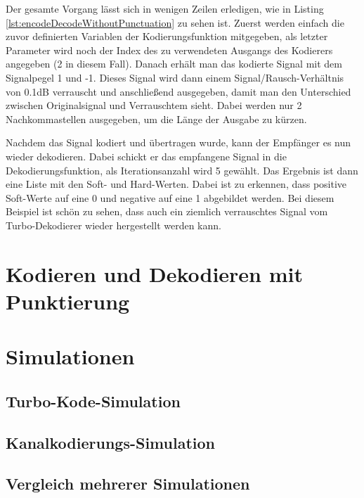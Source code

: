 Der gesamte Vorgang lässt sich in wenigen Zeilen erledigen, wie in Listing \ref{lst:encodeDecodeWithoutPunctuation} zu sehen ist. Zuerst werden einfach die zuvor definierten Variablen der Kodierungsfunktion mitgegeben, als letzter Parameter wird noch der Index des zu verwendeten Ausgangs des Kodierers angegeben (2 in diesem Fall). Danach erhält man das kodierte Signal mit dem Signalpegel 1 und -1. Dieses Signal wird dann einem Signal/Rausch-Verhältnis von 0.1dB  verrauscht und anschließend ausgegeben, damit man den Unterschied zwischen Originalsignal und Verrauschtem sieht. Dabei werden nur 2 Nachkommastellen ausgegeben, um die Länge der Ausgabe zu kürzen. 

Nachdem das Signal kodiert und übertragen wurde, kann der Empfänger es nun wieder dekodieren. Dabei schickt er das empfangene Signal in die Dekodierungsfunktion, als Iterationsanzahl wird 5 gewählt. Das Ergebnis ist dann eine Liste mit den Soft- und Hard-Werten. Dabei ist zu erkennen, dass positive Soft-Werte auf eine 0 und negative auf eine 1 abgebildet werden. Bei diesem Beispiel ist schön zu sehen, dass auch ein ziemlich verrauschtes Signal vom Turbo-Dekodierer wieder hergestellt werden kann.
\section{Kodieren und Dekodieren mit Punktierung}
\label{sec:example_withPunctuation}

\section{Simulationen}
\label{sec:example_simulations}

\subsection{Turbo-Kode-Simulation}

\subsection{Kanalkodierungs-Simulation}

\subsection{Vergleich mehrerer Simulationen}